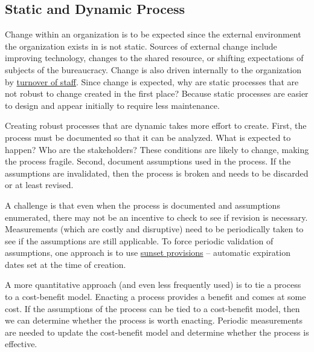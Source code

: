 \subsection*{Static and Dynamic Process\label{sec:static-dynamic-processes}}


Change within an \gls{organization} \iftoggle{glossaryinmargin}{\marginpar{[Glossary]}}{}%
is to be expected since the external environment the organization exists in is not static. 
Sources of external change include improving technology, changes to the \gls{shared resource}, \iftoggle{glossaryinmargin}{\marginpar{[Glossary]}}{}%
or shifting expectations of subjects of the bureaucracy.
Change is also driven internally to the organization by \hyperref[sec:turnover]{turnover of staff}.%
Since change is expected, why are static processes that are not robust to change created in the first place? Because static processes are easier to design and appear initially to require less maintenance.

Creating robust processes that are dynamic takes more effort to create. First, the process must be documented so that it can be analyzed. What is expected to happen? Who are the stakeholders? These conditions are likely to change, making the process fragile. Second, document assumptions used in the process. If the assumptions are invalidated, then the process is broken and needs to be discarded or at least revised. 

A challenge is that even when the process is documented and assumptions enumerated, there may not be an incentive to check to see if revision is necessary. Measurements (which are costly and disruptive) need to be periodically taken to see if the assumptions are still applicable. To force periodic validation of assumptions, one approach is to use \href{https://en.wikipedia.org/wiki/Sunset_provision}{sunset provisions} -- automatic expiration dates set at the time of creation. 
\iftoggle{WPinmargin}{\marginpar{$>$Wikipedia: sunset provisions}}{ }%

A more quantitative approach (and even less frequently used) is to tie a process to a cost-benefit model. Enacting a process provides a benefit and comes at some cost. If the assumptions of the process can be tied to a cost-benefit model, then we can determine whether the process is worth enacting. Periodic measurements are needed to update the cost-benefit model and determine whether the process is effective.

